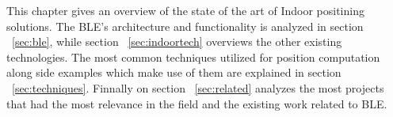 
\label{cap:indoor}

This chapter gives an overview of the state of the art of Indoor positining solutions. The \acf{BLE}'s architecture and functionality is analyzed in section ~\ref{sec:ble}, while section ~\ref{sec:indoortech} overviews the other existing technologies. The most common techniques utilized for position computation along side examples which make use of them are explained in section ~\ref{sec:techniques}. Finnally on section ~\ref{sec:related} analyzes the most projects that had the most relevance in the field and the existing work related to \ac{BLE}.






\cleardoublepage
